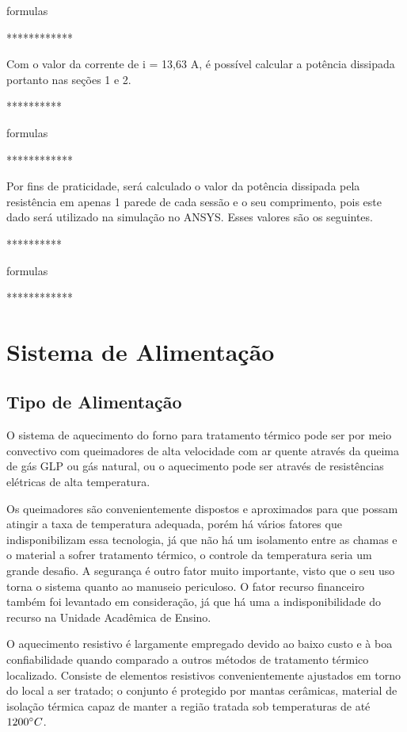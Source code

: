 formulas

************

Com o valor da corrente de i = 13,63 A, é possível calcular a potência dissipada portanto nas seções 1 e 2.

**********

formulas

************

Por fins de praticidade, será calculado o valor da potência dissipada pela resistência em apenas 1 parede de cada sessão e o seu comprimento, pois este dado será utilizado na simulação no ANSYS. Esses valores são os seguintes.

**********

formulas

************

\section{Sistema de Alimentação}

\subsection{Tipo de Alimentação}

O sistema de aquecimento do forno para tratamento térmico pode ser por meio convectivo com queimadores de alta velocidade com ar quente através da queima de gás GLP ou gás natural, ou o aquecimento pode ser através de resistências elétricas de alta temperatura. 

Os queimadores são convenientemente dispostos e aproximados para que possam atingir a taxa de temperatura adequada, porém há vários fatores que indisponibilizam essa tecnologia, já que não há um isolamento entre as chamas e o material a sofrer tratamento térmico, o controle da temperatura seria um grande desafio. A segurança é outro fator muito importante, visto que o seu uso torna o sistema quanto ao manuseio periculoso. O fator recurso financeiro também foi levantado em consideração, já que há uma a indisponibilidade do recurso na Unidade Acadêmica de Ensino.

O aquecimento resistivo é largamente empregado devido ao baixo custo e à boa confiabilidade quando comparado a outros métodos de tratamento térmico localizado. Consiste de elementos resistivos convenientemente ajustados em torno do local a ser tratado; o conjunto é protegido por mantas cerâmicas, material de isolação térmica capaz de manter a região tratada sob temperaturas de até $1200\degree C$.

